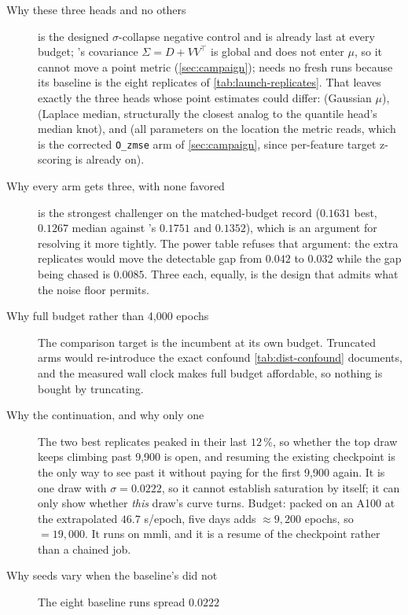 \begin{description}
\item[Why these three heads and no others]  is the designed $\sigma$-collapse
  negative control and is already last at every budget; 's covariance
  $\Sigma = D + VV^{\top}$ is global and does not enter $\mu$, so it cannot move a point
  metric (\cref{sec:campaign});  needs no fresh runs because its baseline
  is the eight replicates of \cref{tab:launch-replicates}. That leaves exactly the three
  heads whose point estimates could differ:  (Gaussian $\mu$), 
  (Laplace median, structurally the closest analog to the quantile head's median knot), and
   (all parameters on the location the metric reads, which is the corrected
  \texttt{O\_zmse} arm of \cref{sec:campaign}, since per-feature target z-scoring is
  already on).
\item[Why every arm gets three, with none favored]  is the strongest challenger
  on the matched-budget record ($0.1631$ best, $0.1267$ median against 's
  $0.1751$ and $0.1352$), which is an argument for resolving it more tightly. The power
  table refuses that argument: the extra replicates would move the detectable gap from
  $0.042$ to $0.032$ while the gap being chased is $0.0085$. Three each, equally, is the
  design that admits what the noise floor permits.
\item[Why full budget rather than 4,000 epochs] The comparison target is the incumbent at
  its own budget. Truncated arms would re-introduce the exact confound
  \cref{tab:dist-confound} documents, and the measured wall clock makes full budget
  affordable, so nothing is bought by truncating.
\item[Why the continuation, and why only one] The two best replicates peaked in their last
  $12\,\%$, so whether the top draw keeps climbing past 9,900 is open, and resuming the
  existing checkpoint is the only way to see past it without paying for the first 9,900
  again. It is one draw with $\sigma = 0.0222$, so it cannot establish saturation by
  itself; it can only show whether \emph{this} draw's curve turns. Budget: packed on an
  A100 at the extrapolated $46.7$ s/epoch, five days adds $\approx 9{,}200$ epochs, so
   $= 19{,}000$. It runs on mmli, and it is a resume of the checkpoint
  rather than a chained job.
\item[Why seeds vary when the baseline's did not] The eight baseline runs spread $0.0222$

\end{description}
